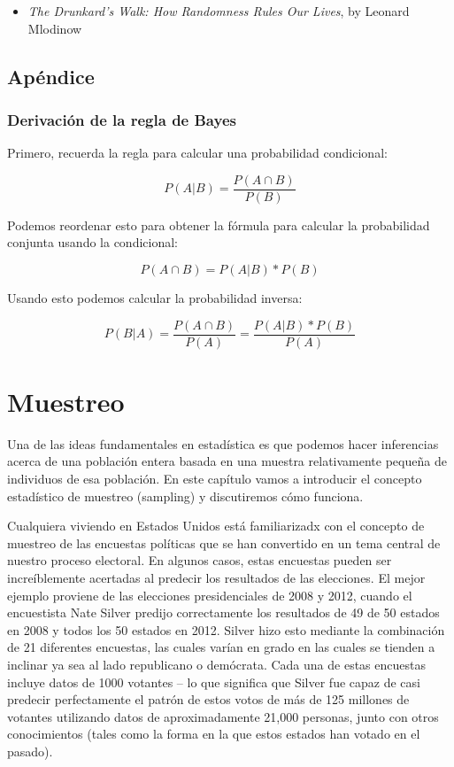 \documentclass[
  12pt,
]{book}
\providecommand{\tightlist}{%
  \setlength{\itemsep}{0pt}\setlength{\parskip}{0pt}}
\begin{document}
\begin{itemize}
\tightlist
\item
  \emph{The Drunkard's Walk: How Randomness Rules Our Lives}, by Leonard Mlodinow
\end{itemize}

\hypertarget{apuxe9ndice-2}{%
\section{Apéndice}\label{apuxe9ndice-2}}

\hypertarget{derivaciuxf3n-de-la-regla-de-bayes}{%
\subsection{Derivación de la regla de Bayes}\label{derivaciuxf3n-de-la-regla-de-bayes}}

Primero, recuerda la regla para calcular una probabilidad condicional:

\[
P(A|B) = \frac{P(A \cap B)}{P(B)}
\]

Podemos reordenar esto para obtener la fórmula para calcular la probabilidad conjunta usando la condicional:

\[
P(A \cap B) = P(A|B) * P(B)
\]

Usando esto podemos calcular la probabilidad inversa:

\[
P(B|A) = \frac{P(A \cap B)}{P(A)} =   \frac{P(A|B)*P(B)}{P(A)}
\]

\hypertarget{sampling}{%
\chapter{Muestreo}\label{sampling}}

Una de las ideas fundamentales en estadística es que podemos hacer inferencias acerca de una población entera basada en una muestra relativamente pequeña de individuos de esa población. En este capítulo vamos a introducir el concepto estadístico de muestreo (sampling) y discutiremos cómo funciona.

Cualquiera viviendo en Estados Unidos está familiarizadx con el concepto de muestreo de las encuestas políticas que se han convertido en un tema central de nuestro proceso electoral. En algunos casos, estas encuestas pueden ser increíblemente acertadas al predecir los resultados de las elecciones. El mejor ejemplo proviene de las elecciones presidenciales de 2008 y 2012, cuando el encuestista Nate Silver predijo correctamente los resultados de 49 de 50 estados en 2008 y todos los 50 estados en 2012. Silver hizo esto mediante la combinación de 21 diferentes encuestas, las cuales varían en grado en las cuales se tienden a inclinar ya sea al lado republicano o demócrata. Cada una de estas encuestas incluye datos de 1000 votantes -- lo que significa que Silver fue capaz de casi predecir perfectamente el patrón de estos votos de más de 125 millones de votantes utilizando datos de aproximadamente 21,000 personas, junto con otros conocimientos (tales como la forma en la que estos estados han votado en el pasado).
\end{document}
